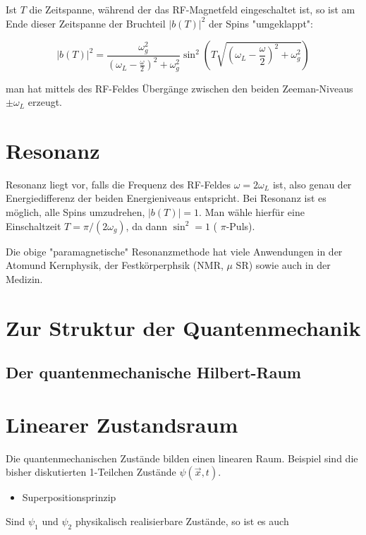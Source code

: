 \documentclass[10pt, letterpaper]{article}
\begin{document}
Ist $T$ die Zeitspanne, während der das RF-Magnetfeld eingeschaltet ist, so ist am Ende dieser Zeitspanne der Bruchteil $|b(T)|^{2}$ der Spins "umgeklappt":

$$
|b(T)|^{2}=\frac{\omega_{g}^{2}}{\left(\omega_{L}-\frac{\omega}{2}\right)^{2}+\omega_{g}^{2}} \sin ^{2}\left(T \sqrt{\left(\omega_{L}-\frac{\omega}{2}\right)^{2}+\omega_{g}^{2}}\right)
$$

man hat mittels des RF-Feldes Übergänge zwischen den beiden Zeeman-Niveaus $\pm \omega_{L}$ erzeugt.

\section*{Resonanz}
Resonanz liegt vor, falls die Frequenz des RF-Feldes $\omega=2 \omega_{L}$ ist, also genau der Energiedifferenz der beiden Energieniveaus entspricht. Bei Resonanz ist es möglich, alle Spins umzudrehen, $|b(T)|=1$. Man wähle hierfür eine Einschaltzeit $T=\pi /\left(2 \omega_{g}\right)$, da dann $\sin ^{2}=1$ ( $\pi$-Puls).

Die obige "paramagnetische" Resonanzmethode hat viele Anwendungen in der Atomund Kernphysik, der Festkörperphsik (NMR, $\mu$ SR) sowie auch in der Medizin.



\pagebreak

\section{Zur Struktur der Quantenmechanik}

\subsection*{Der quantenmechanische Hilbert-Raum}

\section*{Linearer Zustandsraum}
Die quantenmechanischen Zustände bilden einen linearen Raum. Beispiel sind die bisher diskutierten 1-Teilchen Zustände $\psi(\vec{x}, t)$.

\begin{itemize}
  \item Superpositionsprinzip
\end{itemize}

Sind $\psi_{1}$ und $\psi_{2}$ physikalisch realisierbare Zustände, so ist es auch
\end{document}
